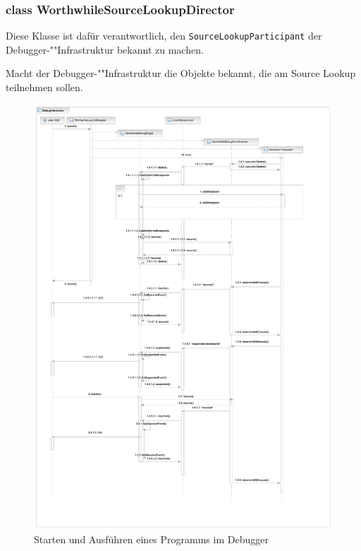 \subsubsection{class WorthwhileSourceLookupDirector}

Diese Klasse ist dafür verantwortlich, den \texttt{SourceLookupParticipant} der Debugger-""Infrastruktur bekannt zu machen.

\begin{description}
	 Macht der Debugger-""Infrastruktur die Objekte bekannt, die am Source Lookup teilnehmen sollen.
\end{description}

\begin{figure}
	\caption{Starten und Ausführen eines Programms im Debugger}
	\hspace{-1.9cm}%
	\includegraphics[height=\textheight]{diagrams/debug_sequence.pdf}
\end{figure}
